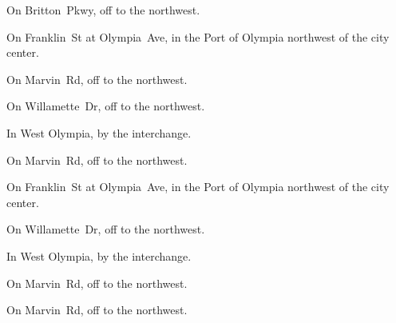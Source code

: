 
\begin{LocationList}

On Britton~Pkwy, off   to the northwest.

On Franklin~St at Olympia~Ave, in the Port of Olympia northwest of the city center.

On Marvin~Rd, off   to the northwest.

\Location{\GarageHQ \Garage}
On Willamette~Dr, off   to the northwest.

In West Olympia, by the  interchange.

\Location{\RecruitmentAgency \Recruitment}
On Marvin~Rd, off   to the northwest.

On Franklin~St at Olympia~Ave, in the Port of Olympia northwest of the city center.

On Willamette~Dr, off   to the northwest.

In West Olympia, by the  interchange.

On Marvin~Rd, off   to the northwest.

\Location{\TruckService \Service}
On Marvin~Rd, off   to the northwest.

\end{LocationList}


